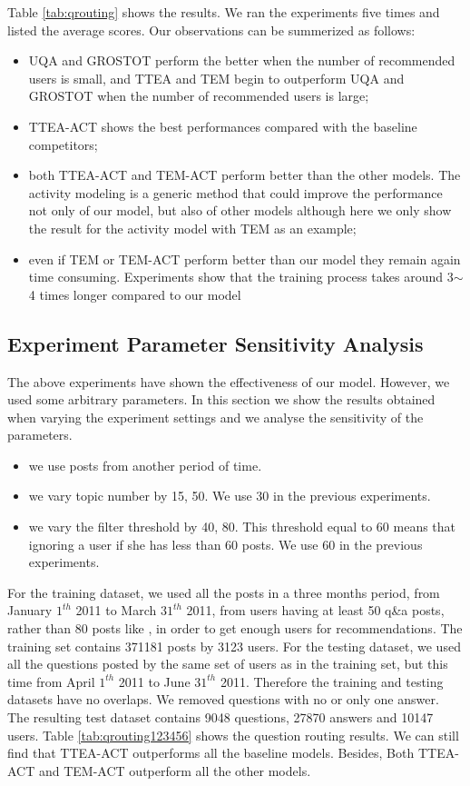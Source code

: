 {{{{{{{Table \ref{tab:qrouting} shows the results. We ran the experiments five times and listed the average scores. Our observations can be summerized as follows:
\begin{itemize}
    \item UQA and GROSTOT perform the better when the number of recommended users is small, and TTEA and TEM begin to outperform UQA and GROSTOT when the number of recommended users is large;
    \item TTEA-ACT shows the best performances compared with the baseline competitors;
    \item both TTEA-ACT and TEM-ACT perform better than the other models. The activity modeling is a generic method that could improve the performance not only of our model, but also of other models although here we only show the result for the activity model with TEM as an example;
    \item even if TEM or TEM-ACT perform better than our model they remain again time consuming. Experiments show that the training process takes around 3$\sim$4 times longer compared to our model
\end{itemize}   


\subsection{Experiment Parameter Sensitivity Analysis}
\label{sec:parasetting}


The above experiments have shown the effectiveness of our model. However, we used some arbitrary parameters. In this section we show the results obtained when varying the experiment settings and we analyse the sensitivity of the parameters.
\begin{itemize}
    \item we use posts from another period of time.
    \item we vary topic number by 15, 50. We use 30 in the previous experiments.
    \item we vary the filter threshold by 40, 80. This threshold equal to 60 means that ignoring a user if she has less than 60 posts. We use 60 in the previous experiments.
\end{itemize}

For the training dataset, we used all the posts in a three months period, from January $1^{th}$ 2011 to March $31^{th}$ 2011, from users having at least 50 q\&a posts, rather than 80 posts like \cite{yang2013cqarank}, in order to get enough users for recommendations. The training set contains 371181 posts by 3123 users. For the testing dataset, we used all the questions posted by the same set of users as in the training set, but this time from April $1^{th}$ 2011 to June $31^{th}$ 2011. Therefore the training and testing datasets have no overlaps. We removed questions with no or only one answer. The resulting test dataset contains 9048 questions, 27870 answers and 10147 users. 
Table \ref{tab:qrouting123456} shows the question routing results. We can still find that TTEA-ACT outperforms all the baseline models. Besides, Both TTEA-ACT and TEM-ACT outperform all the other models. 

}}}}}}}

